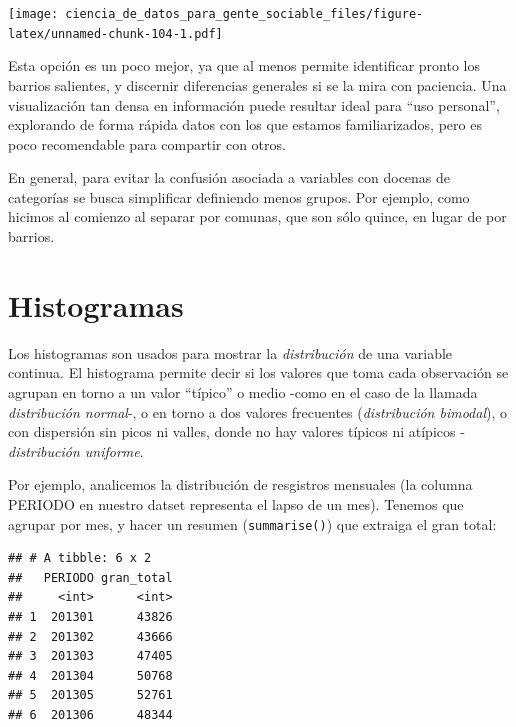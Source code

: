 \documentclass[]{book}
\newenvironment{Shaded}{\begin{snugshade}}{\end{snugshade}}
\newcommand{\KeywordTok}[1]{\textcolor[rgb]{0.13,0.29,0.53}{\textbf{#1}}}
\newcommand{\DataTypeTok}[1]{\textcolor[rgb]{0.13,0.29,0.53}{#1}}
\newcommand{\StringTok}[1]{\textcolor[rgb]{0.31,0.60,0.02}{#1}}
\newcommand{\OperatorTok}[1]{\textcolor[rgb]{0.81,0.36,0.00}{\textbf{#1}}}
\newcommand{\NormalTok}[1]{#1}
\begin{document}
\texttt{[image: ciencia\_de\_datos\_para\_gente\_sociable\_files/figure-latex/unnamed-chunk-104-1.pdf]}

Esta opción es un poco mejor, ya que al menos permite identificar pronto
los barrios salientes, y discernir diferencias generales si se la mira
con paciencia. Una visualización tan densa en información puede resultar
ideal para ``uso personal'', explorando de forma rápida datos con los
que estamos familiarizados, pero es poco recomendable para compartir con
otros.

En general, para evitar la confusión asociada a variables con docenas de
categorías se busca simplificar definiendo menos grupos. Por ejemplo,
como hicimos al comienzo al separar por comunas, que son sólo quince, en
lugar de por barrios.

\section{Histogramas}\label{histogramas}

Los histogramas son usados para mostrar la \emph{distribución} de una
variable continua. El histograma permite decir si los valores que toma
cada observación se agrupan en torno a un valor ``típico'' o medio -como
en el caso de la llamada \emph{distribución normal}-, o en torno a dos
valores frecuentes (\emph{distribución bimodal}), o con dispersión sin
picos ni valles, donde no hay valores típicos ni atípicos -
\emph{distribución uniforme}.

Por ejemplo, analicemos la distribución de resgistros mensuales (la
columna PERIODO en nuestro datset representa el lapso de un mes).
Tenemos que agrupar por mes, y hacer un resumen (\texttt{summarise()})
que extraiga el gran total:

\begin{Shaded}
\end{Shaded}

\begin{verbatim}
## # A tibble: 6 x 2
##   PERIODO gran_total
##     <int>      <int>
## 1  201301      43826
## 2  201302      43666
## 3  201303      47405
## 4  201304      50768
## 5  201305      52761
## 6  201306      48344
\end{verbatim}
\end{document}
